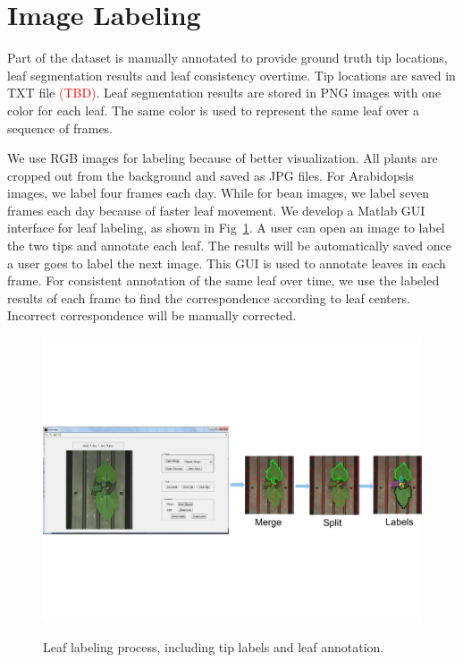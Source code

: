 \section{Image Labeling}

Part of the dataset is manually annotated to provide ground truth tip locations, leaf segmentation results and leaf consistency overtime. 
Tip locations are saved in TXT file \textcolor{red}{(TBD)}.
Leaf segmentation results are stored in PNG images with one color for each leaf.
The same color is used to represent the same leaf over a sequence of frames. 

We use RGB images for labeling because of better visualization. 
All plants are cropped out from the background and saved as JPG files. 
For Arabidopsis images, we label four frames each day. 
While for bean images, we label seven frames each day because of faster leaf movement. 
We develop a Matlab GUI interface for leaf labeling, as shown in Fig~\ref{fig:label}.
A user can open an image to label the two tips and annotate each leaf. 
The results will be automatically saved once a user goes to label the next image. 
This GUI is used to annotate leaves in each frame. 
For consistent annotation of the same leaf over time, we use the labeled results of each frame to find the correspondence according to leaf centers. 
Incorrect correspondence will be manually corrected. 

\begin{figure}[h]
\centering
\includegraphics[width=.98\textwidth]{figure/labeling}\\
\caption{Leaf labeling process, including tip labels and leaf annotation.}
\label{fig:label}
\end{figure}

